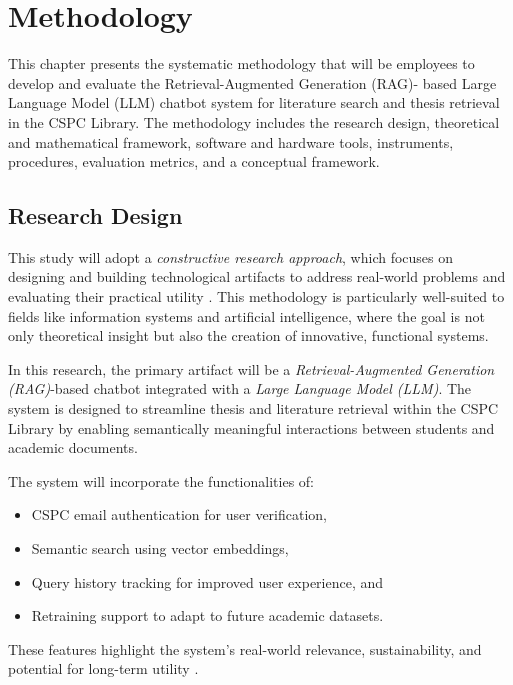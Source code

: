 
\chapter{Methodology}
\begin{refsection}


This chapter presents the systematic methodology that will be employees to develop and evaluate the Retrieval-Augmented Generation (RAG)- based Large Language Model (LLM) chatbot system for literature search and thesis retrieval in the CSPC Library. The methodology includes the research design, theoretical and mathematical framework, software and hardware tools, instruments, procedures, evaluation metrics, and a conceptual framework. 

\section{Research Design}

This study will adopt a \textit{constructive research approach}, which focuses on designing and building technological artifacts to address real-world problems and evaluating their practical utility \citeauthor{lukka2003cons} \citeyear{lukka2003cons}. This methodology is particularly well-suited to fields like information systems and artificial intelligence, where the goal is not only theoretical insight but also the creation of innovative, functional systems.

In this research, the primary artifact will be a \textit{Retrieval-Augmented Generation (RAG)}-based chatbot integrated with a \textit{Large Language Model (LLM)}. The system is designed to streamline thesis and literature retrieval within the CSPC Library by enabling semantically meaningful interactions between students and academic documents. 

The system will incorporate the functionalities of:
\begin{itemize}
    \item CSPC email authentication for user verification,
    \item Semantic search using vector embeddings,
    \item Query history tracking for improved user experience, and
    \item Retraining support to adapt to future academic datasets.
\end{itemize}

These features highlight the system's real-world relevance, sustainability, and potential for long-term utility \citeauthor{hevner2004design}.


\end{refsection}
